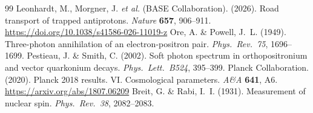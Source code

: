 \documentclass[12pt,a4paper]{article}
\begin{document}
\begin{thebibliography}{99}
     Leonhardt, M., Morgner, J. \textit{et al.} (BASE Collaboration). (2026). Road transport of trapped antiprotons. \textit{Nature} \textbf{657}, 906--911. \url{https://doi.org/10.1038/s41586-026-11019-z}
     Ore, A. \& Powell, J.~L. (1949). Three-photon annihilation of an electron-positron pair. \textit{Phys.\ Rev.\ 75}, 1696--1699.
     Pestieau, J. \& Smith, C. (2002). Soft photon spectrum in orthopositronium and vector quarkonium decays. \textit{Phys.\ Lett.\ B524}, 395--399.
     Planck Collaboration. (2020). Planck 2018 results. VI. Cosmological parameters. \textit{A\&A} \textbf{641}, A6. \url{https://arxiv.org/abs/1807.06209}
     Breit, G. \& Rabi, I.~I. (1931). Measurement of nuclear spin. \textit{Phys.\ Rev.\ 38}, 2082--2083.
\end{thebibliography}
\end{document}
